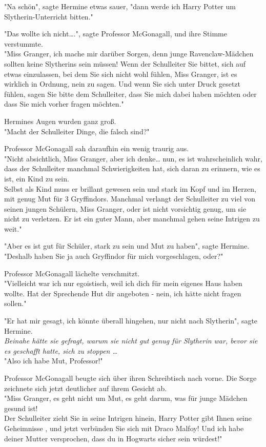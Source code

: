 {"Na schön", sagte Hermine etwas sauer, "dann werde ich Harry Potter um Slytherin-Unterricht bitten."

"Das wollte ich nicht….", sagte Professor McGonagall, und ihre Stimme verstummte.\\ "Miss Granger, ich mache mir darüber Sorgen, denn junge Ravenclaw-Mädchen sollten keine Slytherins sein müssen! Wenn der Schulleiter Sie bittet, sich auf etwas einzulassen, bei dem Sie sich nicht wohl fühlen, Miss Granger, ist es wirklich in Ordnung, nein zu sagen. Und wenn Sie sich unter Druck gesetzt fühlen, sagen Sie bitte dem Schulleiter, dass Sie mich dabei haben möchten oder dass Sie mich vorher fragen möchten."

Hermines Augen wurden ganz groß.\\ "Macht der Schulleiter Dinge, die falsch sind?"

Professor McGonagall sah daraufhin ein wenig traurig aus.\\ "Nicht absichtlich, Miss Granger, aber ich denke… nun, es ist wahrscheinlich wahr, dass der Schulleiter manchmal Schwierigkeiten hat, sich daran zu erinnern, wie es ist, ein Kind zu sein.\\ Selbst als Kind muss er brillant gewesen sein und stark im Kopf und im Herzen, mit genug Mut für 3 Gryffindors. Manchmal verlangt der Schulleiter zu viel von seinen jungen Schülern, Miss Granger, oder ist nicht vorsichtig genug, um sie nicht zu verletzen. Er ist ein guter Mann, aber manchmal gehen seine Intrigen zu weit."

"Aber es ist gut für Schüler, stark zu sein und Mut zu haben", sagte Hermine.\\ "Deshalb haben Sie ja auch Gryffindor für mich vorgeschlagen, oder?"

Professor McGonagall lächelte verschmitzt.\\ "Vielleicht war ich nur egoistisch, weil ich dich für mein eigenes Haus haben wollte. Hat der Sprechende Hut dir angeboten - nein, ich hätte nicht fragen sollen."

"Er hat mir gesagt, ich könnte überall hingehen, nur nicht nach Slytherin", sagte Hermine.\\ \emph{Beinahe hätte sie gefragt, warum sie nicht gut genug für Slytherin war, bevor sie es geschafft hatte, sich zu stoppen …}\\ "Also ich habe Mut, Professor!"

Professor McGonagall beugte sich über ihren Schreibtisch nach vorne. Die Sorge zeichnete sich jetzt deutlicher auf ihrem Gesicht ab.\\ "Miss Granger, es geht nicht um Mut, es geht darum, was für junge Mädchen gesund ist!\\ Der Schulleiter zieht Sie in seine Intrigen hinein, Harry Potter gibt Ihnen seine Geheimnisse , und jetzt verbünden Sie sich mit Draco Malfoy! Und ich habe deiner Mutter versprochen, dass du in Hogwarts sicher sein würdest!"

}
